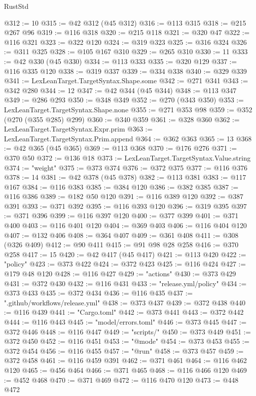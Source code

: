\begin{lexlean}{RustStd}
\begin{coremodule}
@312 := 10
@315 := @42 @312 (@45 @312)
@316 := @113 @315
@318 := @215 @267 @96
@319 := @116 @318
@320 := @215 @118
@321 := @320 @47
@322 := @116 @321
@323 := @322 @120
@324 := @319 @323
@325 := @316 @324
@326 := @311 @325
@328 := @105 @167 @310
@329 := @265 @310
@330 := 11
@333 := @42 @330 (@45 @330)
@334 := @113 @333
@335 := @320 @129
@337 := @116 @335 @120
@338 := @319 @337
@339 := @334 @338
@340 := @329 @339
@341 := LexLeanTarget.TargetSyntax.Shape.some
@342 := @271 @341
@343 := @342 @280
@344 := 12
@347 := @42 @344 (@45 @344)
@348 := @113 @347
@349 := @286 @293
@350 := @348 @349
@352 := @270 (@343 @350)
@353 := LexLeanTarget.TargetSyntax.Shape.none
@355 := @271 @353 @98
@359 := @352 (@270 (@355 @285) @299)
@360 := @340 @359
@361 := @328 @360
@362 := LexLeanTarget.TargetSyntax.Expr.prim
@363 := LexLeanTarget.TargetSyntax.Prim.append
@364 := @362 @363
@365 := 13
@368 := @42 @365 (@45 @365)
@369 := @113 @368
@370 := @176 @276
@371 := @370 @50
@372 := @136 @18
@373 := LexLeanTarget.TargetSyntax.Value.string
@374 := "weight"
@375 := @373 @374
@376 := @372 @375
@377 := @116 @376
@378 := 14
@381 := @42 @378 (@45 @378)
@382 := @113 @381
@383 := @117 @167
@384 := @116 @383
@385 := @384 @120
@386 := @382 @385
@387 := @116 @386
@389 := @182 @50 @120
@391 := @116 @389 @120
@392 := @387 @391
@393 := @371 @392
@395 := @116 @393 @120
@396 := @319 @395
@397 := @371 @396
@399 := @116 @397 @120
@400 := @377 @399
@401 := @371 @400
@403 := @116 @401 @120
@404 := @369 @403
@406 := @116 @404 @120
@407 := @132 @406
@408 := @364 @407
@409 := @361 @408
@411 := @308 (@326 @409)
@412 := @90 @411
@415 := @91 @98 @28 @258
@416 := @370 @258
@417 := 15
@420 := @42 @417 (@45 @417)
@421 := @113 @420
@422 := "policy"
@423 := @373 @422
@424 := @372 @423
@425 := @116 @424
@427 := @179 @48 @120
@428 := @116 @427
@429 := "actions"
@430 := @373 @429
@431 := @372 @430
@432 := @116 @431
@433 := "release.yml/policy"
@434 := @373 @433
@435 := @372 @434
@436 := @116 @435
@437 := ".github/workflows/release.yml"
@438 := @373 @437
@439 := @372 @438
@440 := @116 @439
@441 := "Cargo.toml"
@442 := @373 @441
@443 := @372 @442
@444 := @116 @443
@445 := "model/errors.toml"
@446 := @373 @445
@447 := @372 @446
@448 := @116 @447
@449 := "scripts/"
@450 := @373 @449
@451 := @372 @450
@452 := @116 @451
@453 := "@mode"
@454 := @373 @453
@455 := @372 @454
@456 := @116 @455
@457 := "@run"
@458 := @373 @457
@459 := @372 @458
@461 := @116 @459 @391
@462 := @371 @461
@464 := @116 @462 @120
@465 := @456 @464
@466 := @371 @465
@468 := @116 @466 @120
@469 := @452 @468
@470 := @371 @469
@472 := @116 @470 @120
@473 := @448 @472

\end{coremodule}
\end{lexlean}

